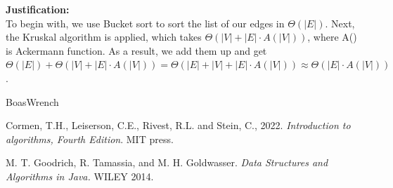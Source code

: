 \documentclass[dvipsnames]{article}
\begin{document}
\begin{enumerate}
\begin{enumerate}
    \textbf{Justification:}\\
    To begin with, we use Bucket sort to sort the list of our edges in $\Theta(|E|)$. Next, the Kruskal algorithm is applied, which takes $\Theta(|V|+|E|\cdot A(|V|))$, where A() is Ackermann function. As a result, we add them up and get $\Theta(|E|) + \Theta(|V| + |E|\cdot A(|V|)) = \Theta(|E| + |V| + |E|\cdot A(|V|)) \approx \Theta(|E|\cdot A(|V|))$.
    \color{black}

  \end{enumerate}
  
\end{enumerate}

\begin{thebibliography}{BoasWrench}

Cormen, T.H., Leiserson, C.E., Rivest, R.L. and Stein, C., 2022. \emph{Introduction to algorithms, Fourth Edition}. MIT press.

M. T. Goodrich, R. Tamassia, and M. H. Goldwasser. \emph{Data Structures and Algorithms in Java.} WILEY 2014.

\end{thebibliography}
\end{document}
